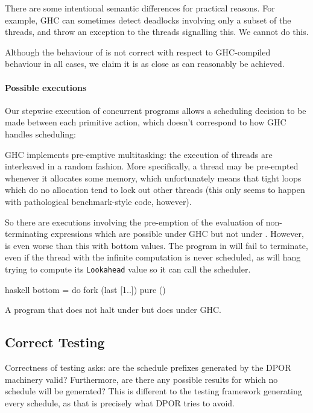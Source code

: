 There are some intentional semantic differences for practical reasons.
For example, GHC can sometimes detect deadlocks involving only a
subset of the threads, and throw an exception to the threads
signalling this.  We cannot do this.

Although the behaviour of \dejafu{} is not correct with respect to
GHC-compiled behaviour in all cases, we claim it is as close as can
reasonably be achieved.

\paragraph{Possible executions}
Our stepwise execution of concurrent programs allows a scheduling
decision to be made between each primitive action, which doesn't
correspond to how GHC handles scheduling:

\begin{displayquote}
  GHC implements pre-emptive multitasking: the execution of threads
  are interleaved in a random fashion.  More specifically, a thread may
  be pre-empted whenever it allocates some memory, which unfortunately
  means that tight loops which do no allocation tend to lock out other
  threads (this only seems to happen with pathological benchmark-style
  code, however).\cite{control_concurrent}
\end{displayquote}

So there are executions involving the pre-emption of the evaluation of
non-terminating expressions which are possible under GHC but not under
\dejafu{}.  However, \dejafu{} is even worse than this with bottom
values.  The program in  will fail to terminate, even
if the thread with the infinite computation is never scheduled, as
\dejafu{} will hang trying to compute its \verb|Lookahead| value so it
can call the scheduler.

\begin{listing}
\centering
\begin{cminted}{haskell}
bottom = do
  fork (last [1..])
  pure ()
\end{cminted}
\caption{A program that does not halt under \dejafu{} but does under GHC.}\label{lst:bottom}
\end{listing}

\subsection{Correct Testing}

Correctness of testing asks: are the schedule prefixes generated by
the DPOR machinery valid?  Furthermore, are there any possible results
for which no schedule will be generated?  This is different to the
testing framework generating every schedule, as that is precisely what
DPOR tries to avoid.

